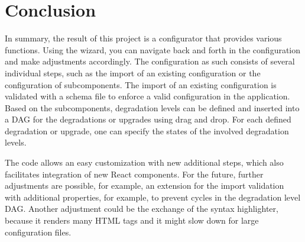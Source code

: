 \chapter{Conclusion}

In summary, the result of this project is a configurator that provides various functions. Using the wizard, you can navigate back and forth in the configuration and make adjustments accordingly. The configuration as such consists of several individual steps, such as the import of an existing configuration or the configuration of subcomponents. The import of an existing configuration is validated with a schema file to enforce a valid configuration in the application. Based on the subcomponents, degradation levels can be defined and inserted into a DAG for the degradations or upgrades using drag and drop. For each defined degradation or upgrade, one can specify the states of the involved degradation levels.

The code allows an easy customization with new additional steps, which also facilitates integration of new React components. For the future, further adjustments are possible, for example, an extension for the import validation with additional properties, for example, to prevent cycles in the degradation level DAG. Another adjustment could be the exchange of the syntax highlighter, because it renders many HTML tags and it might slow down for large configuration files.
